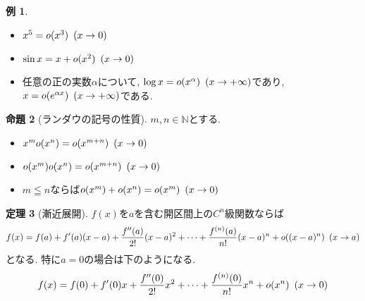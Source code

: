 \documentclass[dvipdfmx,a4paper,11pt]{article}
\newcommand{\N}{\mathbb{N}}
\theoremstyle{definition}
\newtheorem{thm}{定理}
\newtheorem{prop}[thm]{命題}
\newtheorem{exa}[thm]{例}
\begin{document}
 \begin{exa}
 \begin{itemize}
 \item $x^5 = o(x^3) \text{\,\,\,} (x \rightarrow 0) $
 \item $\sin x = x + o(x^2) \text{\,\,\,} (x \rightarrow 0) $
 \item 任意の正の実数$\alpha$について, $\log x = o(x^{\alpha}) \text{\,\,\,} (x \rightarrow +\infty) $であり, $x = o(e^{\alpha x}) \text{\,\,\,} (x \rightarrow +\infty)$である.
 \end{itemize}

 \end{exa}

\begin{tcolorbox}[
    colback = white,
    colframe = green!35!black,
    fonttitle = \bfseries,
    breakable = true]
    \begin{prop}[ランダウの記号の性質]
$m,n \in \N$とする.
 \begin{itemize}
 \item $x^m o(x^n) = o(x^{m+n}) \text{\,\,\,} (x \rightarrow 0) $
 \item $o(x^m) o(x^n) = o(x^{m+n}) \text{\,\,\,} (x \rightarrow 0) $
 \item $m \leqq n$ならば$o(x^m) + o(x^n) = o(x^{m}) \text{\,\,\,} (x \rightarrow 0) $
 \end{itemize}
    \end{prop}
 \end{tcolorbox}
 
\begin{tcolorbox}[
    colback = white,
    colframe = green!35!black,
    fonttitle = \bfseries,
    breakable = true]
    \begin{thm}[漸近展開]
$f(x)$を$a$を含む開区間上の$C^n$級関数ならば
\begin{align*}
\begin{split}
f(x) &= f(a) + f'(a) (x-a) + \frac{f''(a)}{2!}(x-a)^2 + \cdots +  \frac{f^{(n)}(a)}{n!}(x-a)^{n} + o((x-a)^n) \text{\,\,\,}(x \rightarrow a) \\
\end{split}
\end{align*}
となる.
特に$a=0$の場合は下のようになる.
\begin{align*}
\begin{split}
f(x) &= f(0) + f'(0) x + \frac{f''(0)}{2!}x^2 + \cdots +  \frac{f^{(n)}(0)}{n!}x^{n} + o(x^n) \text{\,\,\,}(x \rightarrow 0) \\
\end{split}
\end{align*}
    \end{thm}
 \end{tcolorbox}
 
\end{document}
